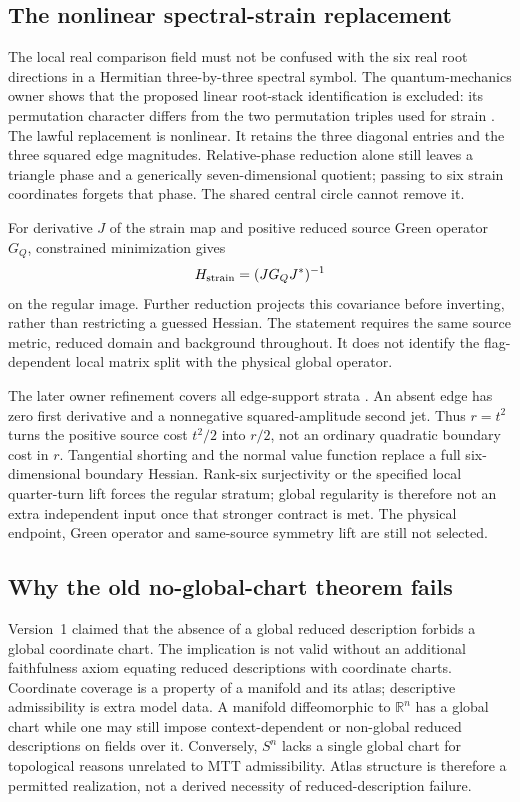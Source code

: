 \documentclass[11pt]{article}
\begin{document}
\subsection{The nonlinear spectral-strain replacement}
\label{sec:nonlinear-strain}

The local real comparison field must not be confused with the six real
root directions in a Hermitian three-by-three spectral symbol. The
quantum-mechanics owner shows that the proposed linear root-stack
identification is excluded: its permutation character differs from the
two permutation triples used for strain \cite{OwnerQM,ConsumerStrain}.
The lawful replacement is nonlinear. It retains the three diagonal
entries and the three squared edge magnitudes. Relative-phase reduction
alone still leaves a triangle phase and a generically seven-dimensional
quotient; passing to six strain coordinates forgets that phase. The
shared central circle cannot remove it.

For derivative \(J\) of the strain map and positive reduced source Green
operator \(G_Q\), constrained minimization gives
\[
 H_{\rm strain}=(JG_QJ^*)^{-1}
\]
on the regular image. Further reduction projects this covariance before
inverting, rather than restricting a guessed Hessian. The statement
requires the same source metric, reduced domain and background throughout.
It does not identify the flag-dependent local matrix split with the
physical global operator.

The later owner refinement covers all edge-support strata
\cite{ConsumerSupportStrain}. An absent edge has zero first derivative
and a nonnegative squared-amplitude second jet. Thus \(r=t^2\) turns the
positive source cost \(t^2/2\) into \(r/2\), not an ordinary quadratic
boundary cost in \(r\). Tangential shorting and the normal value function
replace a full six-dimensional boundary Hessian. Rank-six surjectivity
or the specified local quarter-turn lift forces the regular stratum;
global regularity is therefore not an extra independent input once that
stronger contract is met. The physical endpoint, Green operator and
same-source symmetry lift are still not selected.

\subsection{Why the old no-global-chart theorem fails}

Version~1 claimed that the absence of a global reduced description forbids a
global coordinate chart.  The implication is not valid without an additional
faithfulness axiom equating reduced descriptions with coordinate charts.
Coordinate coverage is a property of a manifold and its atlas; descriptive
admissibility is extra model data.  A manifold diffeomorphic to
$\mathbb R^n$ has a global chart while one may still impose context-dependent
or non-global reduced descriptions on fields over it.  Conversely, $S^n$
lacks a single global chart for topological reasons unrelated to MTT
admissibility.  Atlas structure is therefore a permitted realization, not a
derived necessity of reduced-description failure.
\end{document}
